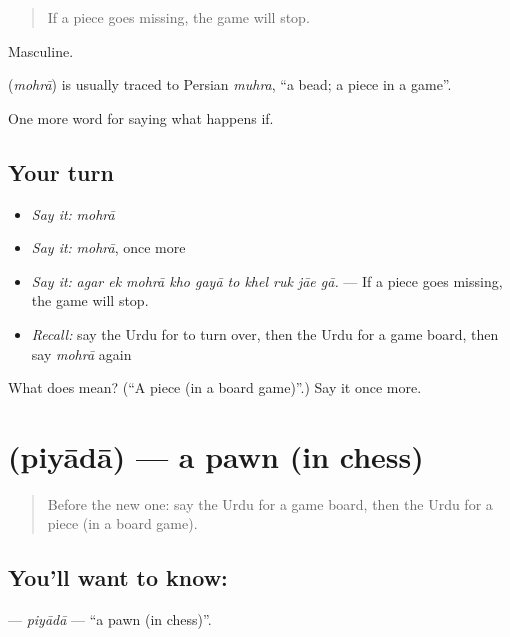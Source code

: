 \begin{quote}
If a piece goes missing, the game will stop.
\end{quote}

Masculine.

\begin{cousinweb}
\textbf{} (\emph{mohrā}) is usually traced to Persian \emph{muhra}, \textquotedblleft{}a bead; a piece in a game\textquotedblright{}.
\end{cousinweb}

\begin{grammarlens}[title={What you've built}]
One more word for saying what happens if.
\end{grammarlens}

\subsection*{Your turn}
\begin{itemize}
\raggedright
  \item \emph{Say it:} \emph{mohrā}
  \item \emph{Say it:} \emph{mohrā}, once more
  \item \emph{Say it:} \emph{agar ek mohrā kho gayā to khel ruk jāe gā.} — If a piece goes missing, the game will stop.
  \item \emph{Recall:} say the Urdu for to turn over, then the Urdu for a game board, then say \emph{mohrā} again
\end{itemize}

\begin{tcolorbox}[breakable,colback=teal!4,colframe=teal!35!black,title={Before you move on}]
What does  mean? (\textquotedblleft{}A piece (in a board game)\textquotedblright{}.) Say it once more.
\end{tcolorbox}
\section[\texorpdfstring{\ur{پیادہ} (piyādā)}{پیادہ (piyādā)}]{ (piyādā) — a pawn (in chess)}

\label{lesson:UR-C534-piyada}



\begin{quote}
Before the new one: say the Urdu for a game board, then the Urdu for a piece (in a board game).
\end{quote}

\subsection*{You'll want to know: }
\textbf{} — \emph{piyādā} — \textquotedblleft{}a pawn (in chess)\textquotedblright{}.

